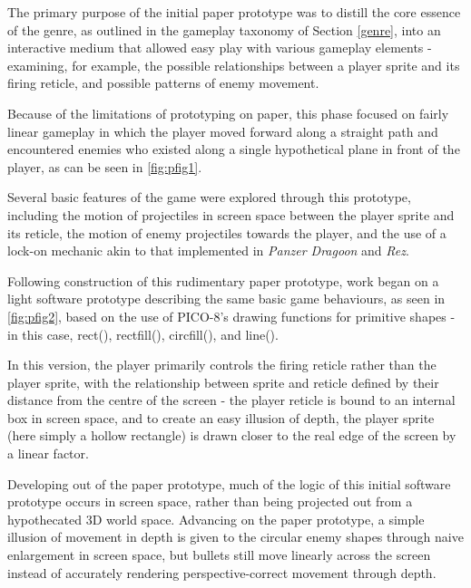\documentclass[11pt]{article}
\begin{document}
The primary purpose of the initial paper prototype was to distill the core essence of the
genre, as outlined in the gameplay taxonomy of Section \ref{genre}, into an interactive
medium that allowed easy play with various gameplay elements - examining, for example,
the possible relationships between a player sprite and its firing reticle, and possible
patterns of enemy movement.

Because of the limitations of prototyping on paper, this
phase focused on fairly linear gameplay in which the player moved forward along a straight
path and encountered enemies who existed along a single hypothetical plane in front of
the player, as can be seen in \ref{fig:pfig1}.

Several basic features of the game were explored through this prototype, including the
motion of projectiles in screen space between the player sprite and its reticle, the
motion of enemy projectiles towards the player, and the use of a lock-on mechanic akin to
that implemented in \textit{Panzer Dragoon} and \textit{Rez}.

Following construction of this rudimentary paper prototype, work began on a light software
prototype describing the same basic game behaviours, as seen in \ref{fig:pfig2}, based on the
use of PICO-8's drawing functions for primitive shapes - in this case, rect(), rectfill(),
circfill(), and line().

In this version, the player primarily controls the firing reticle rather than the player sprite,
with the relationship between sprite and reticle defined by their distance from the centre of the
screen - the player reticle is bound to an internal box in screen space, and to create an easy
illusion of depth, the player sprite (here simply a hollow rectangle) is drawn closer to the
real edge of the screen by a linear factor.

Developing out of the paper prototype, much of the logic of this initial software prototype occurs
in screen space, rather than being projected out from a hypothecated 3D world space. Advancing on
the paper prototype, a simple illusion of movement in depth is given to the circular enemy shapes
through naive enlargement in screen space, but bullets still move linearly across the screen instead
of accurately rendering perspective-correct movement through depth.

\end{document}
